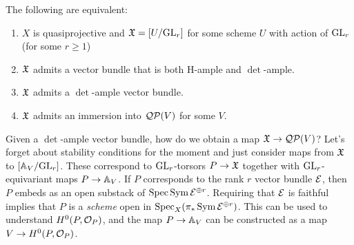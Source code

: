 \documentclass{amsart}
\begin{document}
\begin{thm}
	The following are equivalent:
	\begin{enumerate}
		\item $X$ is quasiprojective and $\Xfr = [U / \GL_r]$ for some scheme $U$ with action of $\GL_r$ (for some $r \geq 1$)
		\item $\Xfr$ admits a vector bundle that is both H-ample and $\det$-ample.
		\item $\Xfr$ admits a $\det$-ample vector bundle.
		\item $\Xfr$ admits an immersion into $\Qc\Pc(V)$ for some $V$.
	\end{enumerate}
\end{thm}

Given a $\det$-ample vector bundle, how do we obtain a map $\Xfr \to \Qc\Pc(V)$?
Let's forget about stability conditions for the moment and just consider maps from $\Xfr$ to $[\AA_V / \GL_r]$.
These correspond to $\GL_r$-torsors $P \to \Xfr$ together with $\GL_r$-equivariant maps $P \to \AA_V$.
If $P$ corresponds to the rank $r$ vector bundle $\Ec$, then $P$ embeds as an open substack of $\Spec \Sym \Ec^{\oplus r}$.
Requiring that $\Ec$ is faithful implies that $P$ is a \emph{scheme} open in $\Spec_X(\pi_* \Sym \Ec^{\oplus r})$.
This can be used to understand $H^0(P, \Oc_P)$, and the map $P \to \AA_V$ can be constructed as a map $V \to H^0(P, \Oc_P)$.
\end{document}
